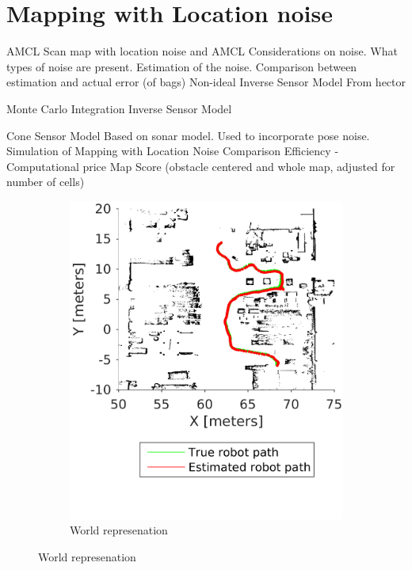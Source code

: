 \section{Mapping with Location noise}
AMCL
Scan map with location noise and AMCL
Considerations on noise. What types of noise are present. Estimation of the noise. Comparison between estimation and actual error (of bags) 
Non-ideal Inverse Sensor Model
From hector

Monte Carlo Integration Inverse Sensor Model 

Cone Sensor Model
Based on sonar model. Used to incorporate pose noise. 
Simulation of Mapping with Location Noise
Comparison
Efficiency - Computational price
Map Score (obstacle centered and whole map, adjusted for number of cells)


\begin{figure}
	\centering
	\begin{subfigure}[b]{0.45\textwidth}
		\includegraphics[width=\textwidth]{figures/static_mapping/simulated_robot_estimate_total}
		\caption{World represenation}
		\label{fig:simulated_robot_estimate_total}
	\end{subfigure}

\end{figure}
